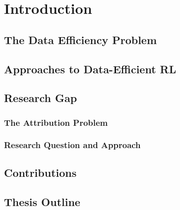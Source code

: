 \chapter{Introduction}
\label{ch:introduction}

\section{The Data Efficiency Problem}
\label{sec:data-efficiency}

\section{Approaches to Data-Efficient RL}
\label{sec:approaches}

\section{Research Gap}
\label{sec:research-gap}

\subsection{The Attribution Problem}
\label{subsec:attribution-problem}

\vspace{2em}

\subsection{Research Question and Approach}
\label{subsec:research-question}

\vspace{2em}

\section{Contributions}
\label{sec:contributions}

\section{Thesis Outline}
\label{sec:outline}
